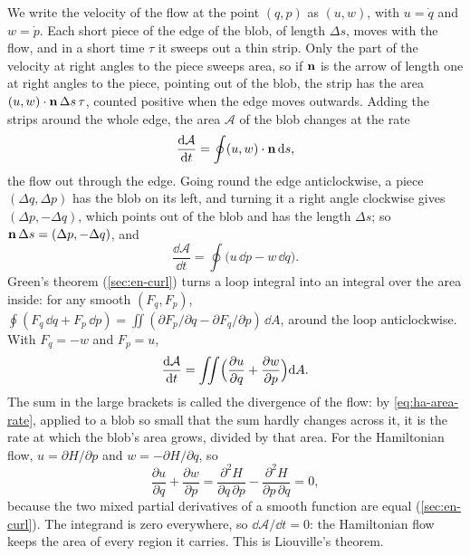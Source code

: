 We write the velocity of the flow at the point $(q, p)$ as $(u, w)$, with
$u = \dot{q}$ and $w = \dot{p}$. Each short piece of the edge of the
blob, of length $\Delta s$, moves with the flow, and in a short time
$\tau$ it sweeps out a thin strip. Only the part of the velocity at
right angles to the piece sweeps area, so if $\bm{\mathrm{n}}$ is the arrow of
length one at right angles to the piece, pointing out of the blob, the
strip has the area $(u, w)\cdot\bm{\mathrm{n}}\,\Delta s\,\tau$, counted
positive when the edge moves outwards. Adding the strips around the whole
edge, the area $\mathcal{A}$ of the blob changes at the rate
\begin{equation*}
   \frac{\mathrm{d}\mathcal{A}}{\mathrm{d} t} = \oint (u, w)\cdot\bm{\mathrm{n}}\,\mathrm{d} s ,
\end{equation*}
the flow out through the edge. Going round the edge anticlockwise, a
piece $(\Delta q, \Delta p)$ has the blob on its left, and turning it a
right angle clockwise gives $(\Delta p, -\Delta q)$, which points out of
the blob and has the length $\Delta s$; so $\bm{\mathrm{n}}\,\Delta s = (\Delta
p, -\Delta q)$, and
\begin{equation*}
   \frac{\dd\mathcal{A}}{\dd t} = \oint\bigl(u\,\dd p - w\,\dd q\bigr) .
\end{equation*}
Green's theorem (\cref{sec:en-curl}) turns a loop integral into an
integral over the area inside: for any smooth $(F_q, F_p)$, $\oint(F_q\,
\dd q + F_p\,\dd p) = \iint(\partial F_p/\partial q - \partial F_q/\partial
p)\,\dd A$, around the loop anticlockwise. With $F_q = -w$ and $F_p = u$,
\begin{equation}
   \frac{\mathrm{d}\mathcal{A}}{\mathrm{d} t} = \iint\Bigl(\frac{\partial u}{\partial q}
   + \frac{\partial w}{\partial p}\Bigr)\mathrm{d} A .
   \label{eq:ha-area-rate}
\end{equation}
The sum in the large brackets is called the divergence of the flow: by
\cref{eq:ha-area-rate}, applied to a blob so small that the sum hardly
changes across it, it is the rate at which the blob's area grows, divided
by that area. For the Hamiltonian
flow, $u = \partial H/\partial p$ and $w = -\partial H/\partial q$, so
\begin{equation*}
   \frac{\partial u}{\partial q} + \frac{\partial w}{\partial p}
   = \frac{\partial^2H}{\partial q\,\partial p}
   - \frac{\partial^2H}{\partial p\,\partial q} = 0 ,
\end{equation*}
because the two mixed partial derivatives of a smooth function are equal
(\cref{sec:en-curl}). The integrand is zero everywhere, so $\dd\mathcal{A}
/\dd t = 0$: the Hamiltonian flow keeps the area of every region it
carries. This is Liouville's theorem.

